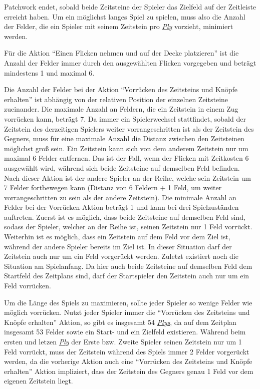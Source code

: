 Patchwork endet, sobald beide Zeitsteine der Spieler das Zielfeld auf der Zeitleiste erreicht haben. Um ein möglichst langes Spiel zu spielen, muss also die Anzahl der Felder, die ein Spieler mit seinem Zeitstein pro \hyperref[text:ply]{\emph{Ply}} vorzieht, minimiert werden.

Für die Aktion \enquote{Einen Flicken nehmen und auf der Decke platzieren} ist die Anzahl der Felder immer durch den ausgewählten Flicken vorgegeben und beträgt mindestens 1 und maximal 6.

\pagebreak

Die Anzahl der Felder bei der Aktion \enquote{Vorrücken des Zeitsteins und Knöpfe erhalten} ist abhängig von der relativen Position der einzelnen Zeitsteine zueinander. Die maximale Anzahl an Feldern, die ein Zeitstein in einem Zug vorrücken kann, beträgt 7. Da immer ein Spielerwechsel stattfindet, sobald der Zeitstein des derzeitigen Spielers weiter vorrangeschritten ist als der Zeitstein des Gegners, muss für eine maximale Anzahl die Distanz zwischen den Zeitsteinen möglichst groß sein. Ein Zeitstein kann sich von dem anderem Zeitstein nur um maximal 6 Felder entfernen. Das ist der Fall, wenn der Flicken mit Zeitkosten 6 ausgewählt wird, während sich beide Zeitsteine auf demselben Feld befinden. Nach dieser Aktion ist der andere Spieler an der Reihe, welche sein Zeitstein um 7 Felder fortbewegen kann (Distanz von 6 Feldern $+$ 1 Feld, um weiter vorrangeschritten zu sein als der andere Zeitstein). Die minimale Anzahl an Felder bei der Vorrücken-Aktion beträgt 1 und kann bei drei Spielzuständen auftreten. Zuerst ist es möglich, dass beide Zeitsteine auf demselben Feld sind, sodass der Spieler, welcher an der Reihe ist, seinen Zeitstein nur 1 Feld vorrückt. Weiterhin ist es möglich, dass ein Zeitstein auf dem Feld vor dem Ziel ist, während der andere Spieler bereits im Ziel ist. In dieser Situation darf der Zeitstein auch nur um ein Feld vorgerückt werden. Zuletzt existiert noch die Situation am Spielanfang. Da hier auch beide Zeitsteine auf demselben Feld \textemdash{} dem Startfeld des Zeitplans \textemdash{} sind, darf der Startspieler den Zeitstein auch nur um ein Feld vorrücken.

Um die Länge des Spiels zu maximieren, sollte jeder Spieler so wenige Felder wie möglich vorrücken. Nutzt jeder Spieler immer die \enquote{Vorrücken des Zeitsteins und Knöpfe erhalten} Aktion, so gibt es insgesamt 54 \hyperref[text:ply]{\emph{Plys}}, da auf dem Zeitplan insgesamt 53 Felder sowie ein Start- und ein Zielfeld existieren. Während beim ersten und letzen \hyperref[text:ply]{\emph{Ply}} der Erste bzw. Zweite Spieler seinen Zeitstein nur um 1 Feld vorrückt, muss der Zeitstein während des Spiels immer 2 Felder vorgerückt werden, da die vorherige Aktion \textemdash{} auch eine \enquote{Vorrücken des Zeitsteins und Knöpfe erhalten} Aktion \textemdash{} impliziert, dass der Zeitstein des Gegners genau 1 Feld vor dem eigenen Zeitstein liegt.

